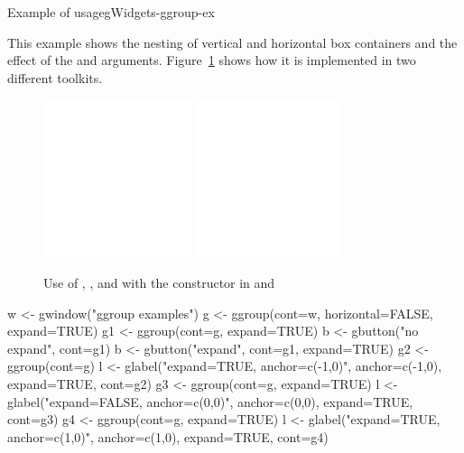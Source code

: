 \begin{example}{Example of  usage}{gWidgets-ggroup-ex}

This example shows the nesting of vertical and horizontal box containers and
the effect of the  and 
arguments. Figure~\ref{fig:ggroup-example} shows how it is implemented
in two different toolkits.
\begin{figure}
  \centering
  \includegraphics[width=.45\textwidth]{ex-gWidgets-ggroup-RGtk2}\quad
  \includegraphics[width=.45\textwidth]{ex-gWidgets-ggroup-tcltk}
 \caption{Use of , ,  and
      with the  constructor in  and }
  \label{fig:ggroup-example}
\end{figure}





\begin{Schunk}
\begin{Sinput}
 w  <- gwindow("ggroup examples")
 g  <- ggroup(cont=w, horizontal=FALSE, expand=TRUE)
 g1 <- ggroup(cont=g, expand=TRUE)
 b  <- gbutton("no expand", cont=g1)
 b  <- gbutton("expand", cont=g1, expand=TRUE)
 g2 <- ggroup(cont=g)
 l  <- glabel("expand=TRUE, anchor=c(-1,0)", anchor=c(-1,0), 
             expand=TRUE, cont=g2)
 g3 <- ggroup(cont=g, expand=TRUE)
 l  <- glabel("expand=FALSE, anchor=c(0,0)", anchor=c(0,0), 
             expand=TRUE, cont=g3)
 g4 <- ggroup(cont=g, expand=TRUE)
 l  <- glabel("expand=TRUE, anchor=c(1,0)", anchor=c(1,0), 
             expand=TRUE, cont=g4)
\end{Sinput}
\end{Schunk}
  

\end{example}
